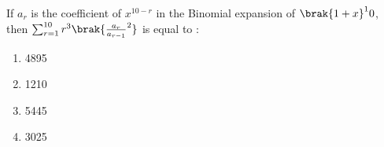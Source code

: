     \item If $a_r$ is the coefficient of $x^{10-r}$ in the Binomial expansion of
        $\brak{1 + x}^10$, then $\sum_{r = 1} ^ {10} r^3\brak{\frac{a_r}{a_{r-1}}^2}$ is equal to :
        \hfill{}
        \begin{multicols}{4}
            \begin{enumerate}
                \item 4895 \columnbreak
                \item 1210 \columnbreak 
                \item 5445 \columnbreak  
                \item 3025
            \end{enumerate}
        \end{multicols}
